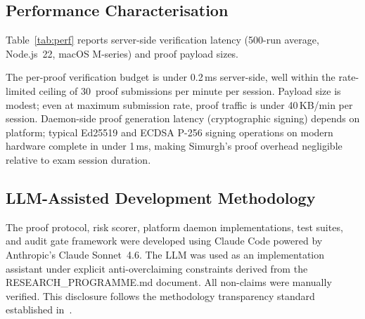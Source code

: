 \documentclass[conference]{IEEEtran}
\begin{document}
\subsection{Performance Characterisation}

Table~\ref{tab:perf} reports server-side verification latency (500-run average, Node.js~22, macOS M-series) and proof payload sizes.

\begin{table}[t]
\centering
\small
\caption{Server-Side Latency and Payload Sizes}
\label{tab:perf}
\end{table}

The per-proof verification budget is under 0.2\,ms server-side, well within the rate-limited ceiling of 30~proof submissions per minute per session. Payload size is modest; even at maximum submission rate, proof traffic is under 40\,KB/min per session. Daemon-side proof generation latency (cryptographic signing) depends on platform; typical Ed25519 and ECDSA P-256 signing operations on modern hardware complete in under 1\,ms, making Simurgh's proof overhead negligible relative to exam session duration.

\subsection{LLM-Assisted Development Methodology}

The proof protocol, risk scorer, platform daemon implementations, test suites, and audit gate framework were developed using Claude Code powered by Anthropic's Claude Sonnet~4.6. The LLM was used as an implementation assistant under explicit anti-overclaiming constraints derived from the RESEARCH\_PROGRAMME.md document. All non-claims were manually verified. This disclosure follows the methodology transparency standard established in~\cite{abedini2026invisible}.
\end{document}
